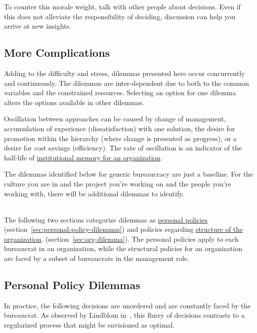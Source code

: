 To counter this morale weight, talk with other people about decisions. 
Even if this does not alleviate the responsibility of deciding, discussion can help you arrive at new insights. 

\subsection*{More Complications}
Adding to the difficulty and stress, dilemmas presented here occur concurrently and continuously. The dilemmas are inter-dependent due to both to the common variables and the constrained resources.
Selecting an option for one dilemma alters the options available in other dilemmas.

Oscillation between approaches can be caused by change of management, accumulation of experience (dissatisfaction) with one solution, the desire for promotion within the hierarchy (where change is presented as progress), or a desire for cost savings (efficiency). The rate of oscillation is an indicator of the half-life of \href{https://en.wikipedia.org/wiki/Institutional_memory}{institutional memory for an organization}.  

The dilemmas identified below for generic bureaucracy are just a baseline. For the culture you are in and the project you're working on and the people you're working with, there will be additional dilemmas to identify. 

\ \\

The following two sections categorize dilemmas as \hyperref[sec:personal-policy-dilemmas]{personal policies} 
\ifsectionref
(section~\ref{sec:personal-policy-dilemmas}) 
\fi
and policies regarding \hyperref[sec:org-dilemma]{structure of the organization}.
\ifsectionref
(section~\ref{sec:org-dilemma}). 
\fi
The personal policies apply to each bureaucrat in an organization, while the structural policies for an organization are faced by a subset of bureaucrats in the management role. 

\subsection*{Personal Policy Dilemmas \label{sec:personal-policy-dilemmas}}

In practice, the following decisions are unordered and are constantly faced by the bureaucrat. As observed by Lindblom in~\cite{1959_Lindblom}, this flurry of decisions contrasts to a regularized process that might be envisioned as optimal.


